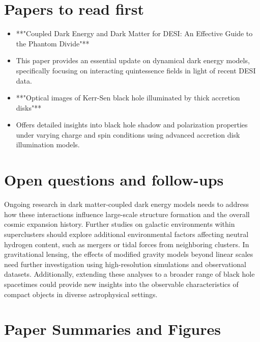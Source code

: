 \documentclass[11pt]{article}
\begin{document}
\section*{Papers to read first}
\begin{itemize}
\item **"Coupled Dark Energy and Dark Matter for DESI: An Effective Guide to the Phantom Divide"**
\item This paper provides an essential update on dynamical dark energy models, specifically focusing on interacting quintessence fields in light of recent DESI data.
\end{itemize}
\begin{itemize}
\item **"Optical images of Kerr-Sen black hole illuminated by thick accretion disks"**
\item Offers detailed insights into black hole shadow and polarization properties under varying charge and spin conditions using advanced accretion disk illumination models.
\end{itemize}
\section*{Open questions and follow-ups}
Ongoing research in dark matter-coupled dark energy models needs to address how these interactions influence large-scale structure formation and the overall cosmic expansion history. Further studies on galactic environments within superclusters should explore additional environmental factors affecting neutral hydrogen content, such as mergers or tidal forces from neighboring clusters.
In gravitational lensing, the effects of modified gravity models beyond linear scales need further investigation using high-resolution simulations and observational datasets. Additionally, extending these analyses to a broader range of black hole spacetimes could provide new insights into the observable characteristics of compact objects in diverse astrophysical settings.
\newpage
\section*{Paper Summaries and Figures}
\end{document}
